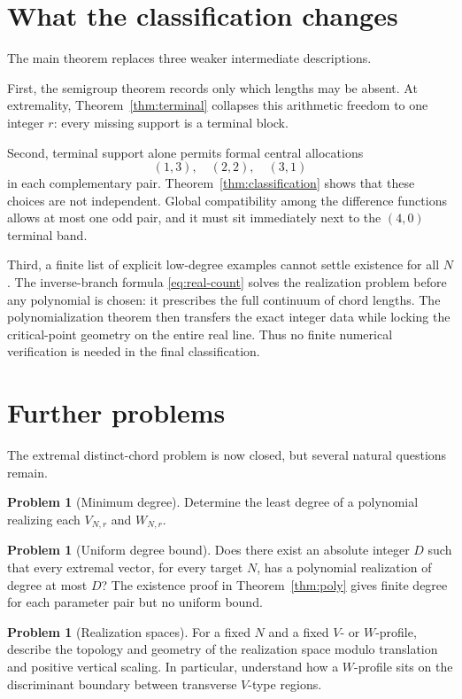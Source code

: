\documentclass[11pt]{article}
\theoremstyle{definition}
\newtheorem{problem}[theorem]{Problem}
\theoremstyle{remark}
\begin{document}
\section{What the classification changes}

The main theorem replaces three weaker intermediate descriptions.

First, the semigroup theorem records only which lengths may be absent.
At extremality, Theorem~\ref{thm:terminal} collapses this arithmetic
freedom to one integer \(r\): every missing support is a terminal block.

Second, terminal support alone permits formal central allocations
\[
(1,3),\quad(2,2),\quad(3,1)
\]
in each complementary pair.  Theorem~\ref{thm:classification} shows that
these choices are not independent.  Global compatibility among the
difference functions allows at most one odd pair, and it must sit
immediately next to the \((4,0)\) terminal band.

Third, a finite list of explicit low-degree examples cannot settle
existence for all \(N\).  The inverse-branch formula
\eqref{eq:real-count} solves the realization problem before any polynomial
is chosen: it prescribes the full continuum of chord lengths.  The
polynomialization theorem then transfers the exact integer data while
locking the critical-point geometry on the entire real line.  Thus no
finite numerical verification is needed in the final classification.

\section{Further problems}

The extremal distinct-chord problem is now closed, but several natural
questions remain.

\begin{problem}[Minimum degree]
Determine the least degree of a polynomial realizing each
\(V_{N,r}\) and \(W_{N,r}\).
\end{problem}

\begin{problem}[Uniform degree bound]
Does there exist an absolute integer \(D\) such that every extremal vector,
for every target \(N\), has a polynomial realization of degree at most \(D\)?
The existence proof in Theorem~\ref{thm:poly} gives finite degree for each
parameter pair but no uniform bound.
\end{problem}

\begin{problem}[Realization spaces]
For a fixed \(N\) and a fixed \(V\)- or \(W\)-profile, describe the topology
and geometry of the realization space modulo translation and positive
vertical scaling.  In particular, understand how a \(W\)-profile sits on
the discriminant boundary between transverse \(V\)-type regions.
\end{problem}
\end{document}
